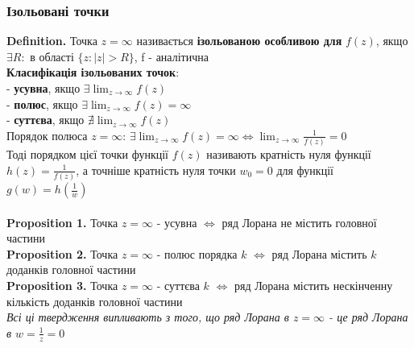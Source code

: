 \documentclass[a4paper, 14pt]{extarticle}
\def\hugespace{\vspace{5mm} \\}
\begin{document}
\subsubsection{Ізольовані точки}
\textbf{Definition.} Точка $z=\infty$ називається \textbf{ізольованою особливою для} $f(z)$, якщо $\exists R:$ в області $\{z: |z|>R\}$, f - аналітична\\
\textbf{Класифікація ізольованих точок}:\\
	 - \textbf{усувна}, якщо $\displaystyle\exists \lim_{z \to \infty} f(z)$\\
	 - \textbf{полюс}, якщо $\displaystyle\exists \lim_{z \to \infty} f(z) = \infty$\\
	 - \textbf{суттєва}, якщо $\displaystyle \nexists \lim_{z \to \infty} f(z)$
	 \hugespace
Порядок полюса $z = \infty$:
$\displaystyle \exists \lim_{z \to \infty} f(z) = \infty \iff \lim_{z \to \infty} \frac{1}{f(z)} = 0$\\
Тоді порядком цієї точки функції $f(z)$ називають кратність нуля функції $\displaystyle h(z) = \frac{1}{f(z)}$, а точніше кратність нуля точки $w_0 = 0$ для функції $\displaystyle g(w) = h\left(\frac{1}{w}\right)$\\
\vspace{5mm}\\
\textbf{Proposition 1.} Точка $z = \infty$ - усувна $\iff$ ряд Лорана не містить головної частини\\
\textbf{Proposition 2.} Точка $z = \infty$ - полюс порядка $k$ $\iff$ ряд Лорана містить $k$ доданків головної частини\\
\textbf{Proposition 3.} Точка $z = \infty$ - суттєва $k$ $\iff$ ряд Лорана містить нескінченну кількість доданків головної частини\\
\textit{Всі ці твердження випливають з того, що ряд Лорана в $z = \infty$ - це ряд Лорана в $\displaystyle w = \frac{1}{z} = 0$}
\hugespace
\end{document}
